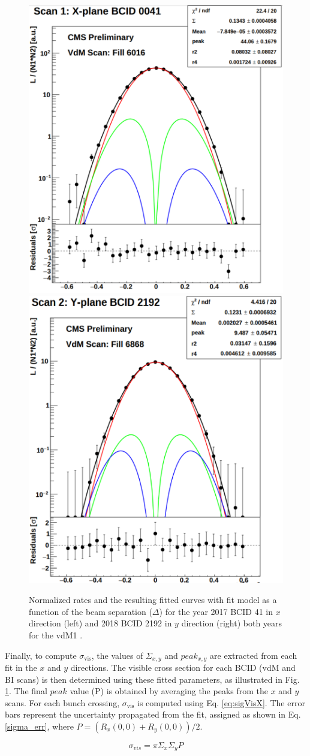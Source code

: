 \begin{figure}[h]
\centering
\includegraphics[width=.4\textwidth,height=0.4\textwidth]{Chapter4/2017_X_Scan_41.png}
\includegraphics[width=.4\textwidth,height=0.4\textwidth]{Chapter4/2018_Y_Scan_2192.png}
\caption[Examples of Fits for vdM1: BCID 41 (2017) and BCID 2192 (2018)]{Normalized rates and the resulting fitted curves with  fit model as a function of the beam separation ($\Delta$) for the year 2017 BCID 41 in $x$ direction (left) and 2018 BCID 2192 in $y$ direction (right) both years for the vdM1 .}
\label{vdM1}
\end{figure}


Finally, to compute $\sigma_{\text{vis}}$, the values of $\Sigma_{x,y}$ and $peak_{x,y}$ are extracted from each fit in the $x$ and $y$ directions. The visible cross section for each BCID (vdM and BI scans) is then determined using these fitted parameters, as illustrated in Fig. \ref{vdM1}. The final $peak$ value (P) is obtained by averaging the peaks from the $x$ and $y$ scans. For each bunch crossing, $\sigma_{\text{vis}}$ is computed using Eq. \ref{eq:sigVisX}. The error bars represent the uncertainty propagated from the fit, assigned as shown in Eq. \ref{sigma_err}, where $P = (R_{x}(0,0) + R_{y}(0,0))/2$.

\begin{equation}
 \sigma_{vis}= \pi \Sigma_{x} \Sigma_{y}P
 \end{equation}



